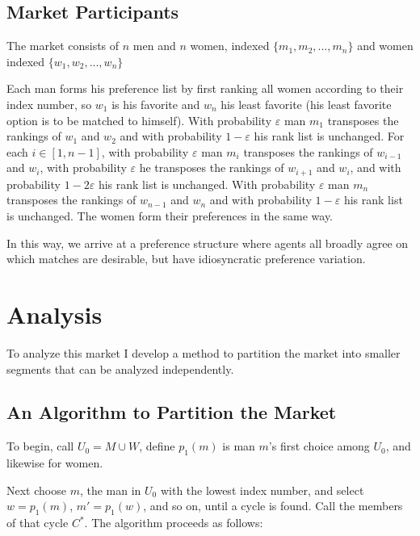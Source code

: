 \documentclass[WP]{AEA}
\begin{document}
\subsection{Market Participants}

The market consists of $n$ men and $n$ women,  indexed $\{ m_1, m_2, ... ,m_n\}$ and women indexed $\{ w_1, w_2, ... ,w_n\}$
	
Each man forms his preference list by first ranking all women according to their index number, so $w_1$ is his favorite and $w_n$ his least favorite (his least favorite option is to be matched to himself).  
With probability $\varepsilon$ man $m_1$ transposes the rankings of $w_{1}$ and $w_2$ and with probability $1-\varepsilon$ his rank list is unchanged.  For each $i  \in [1, n-1]$, with probability $\varepsilon$ man $m_i$ transposes the rankings of $w_{i-1}$ and $w_i$, with probability $\varepsilon$ he transposes the rankings of $w_{i+1}$ and $w_i$, and with probability $1-2\varepsilon$ his rank list is unchanged. With probability $\varepsilon$ man $m_n$ transposes the rankings of $w_{n-1}$ and $w_n$ and with probability $1-\varepsilon$ his rank list is unchanged.
The women form their preferences in the same way.

In this way, we arrive at a preference structure where agents all broadly agree on which matches are desirable, but have idiosyncratic preference variation.
	


	
\section{Analysis}

To analyze this market I develop a method to partition the market into smaller segments that can be analyzed independently.


\subsection{An Algorithm to Partition the Market} \label{subsect:partition}

To begin, call $U_0 = M \cup W$, define $p_1(m)$ is man $m$'s first choice among $U_0$, and likewise for women.

Next choose $m$, the man in $U_0$ with the lowest index number, and select $w = p_1(m)$, $m' = p_1(w)$, and so on, until a cycle is found. Call the members of that cycle $C^*$.  The algorithm proceeds as follows: 
\end{document}
